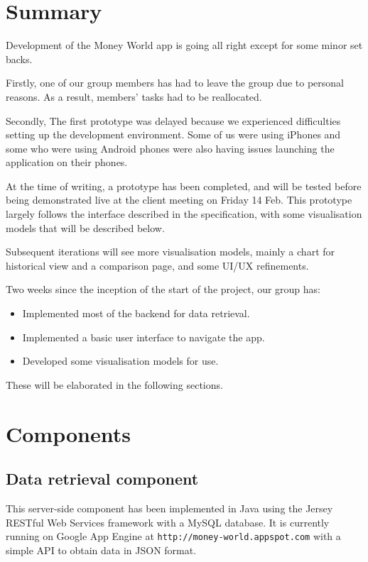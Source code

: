 \documentclass[12pt,a4paper,twoside]{article}
\begin{document}

\newpage
\thispagestyle{empty}
\cleardoublepage
\newpage

\section{Summary}

Development of the Money World app is going all right except for some minor set backs. 

Firstly, one of our group members has had to leave the group due to personal reasons. As a result, members' tasks had to be reallocated. 

Secondly, The first prototype was delayed because we experienced difficulties setting up the development environment. Some of us were using iPhones and some who were using Android phones were also having issues launching the application on their phones. 

At the time of writing, a prototype has been completed, and will be tested before being demonstrated live at the client meeting on Friday 14 Feb. 
This prototype largely follows the interface described in the specification, with some visualisation models that will be described below.

Subsequent iterations will see more visualisation models, mainly a chart for historical view and a comparison page, and some UI/UX refinements.

Two weeks since the inception of the start of the project, our group has:

\begin{itemize}
	\item Implemented most of the backend for data retrieval.
	\item Implemented a basic user interface to navigate the app.
	\item Developed some visualisation models for use.
\end{itemize}

These will be elaborated in the following sections.

\section{Components}

\subsection{Data retrieval component}
This server-side component has been implemented in Java using the Jersey RESTful Web Services framework with a MySQL database. It is currently running on Google App Engine at \texttt{http://money-world.appspot.com} with a simple API to obtain data in JSON format.
\end{document}
